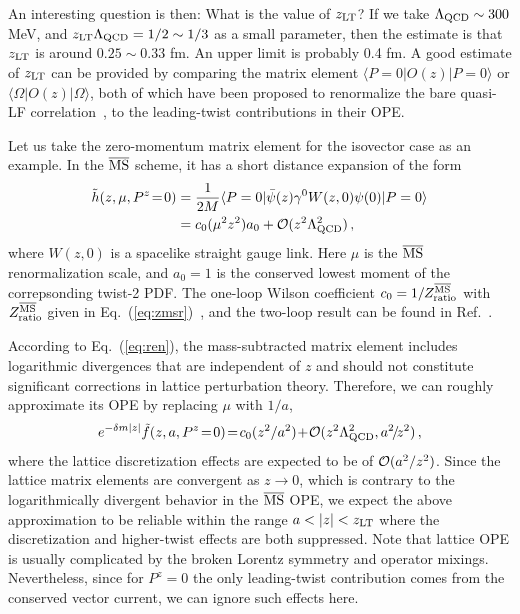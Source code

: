 \documentclass[preprint,12pt]{elsarticle}
\newcommand{\MS}{{\overline{\rm MS}}}
\newcommand{\nn}{\nonumber}
\DeclareRobustCommand{\eq}[1]{Eq.~(\ref{eq:#1})}
\begin{document}
An interesting question is then: What is the value of $z_{\rm LT}$?
If we take $\Lambda_{\rm QCD}\sim 300$ MeV, and  $z_{\rm LT}\Lambda_{\rm QCD}=1/2\sim 1/3$ as
a small parameter, then the estimate is that $z_{\rm LT}$ is around $0.25 \sim 0.33$ fm. An
upper limit is probably 0.4 fm. A good estimate of $z_{\rm LT}$ can be provided by comparing the matrix element $\langle P=0| O(z)|P=0\rangle$ or $\langle \Omega| O(z)|\Omega\rangle$, both of which have been proposed to renormalize the bare quasi-LF correlation~\cite{Radyushkin:2017cyf,Braun:2018brg,Li:2020xml}, to the leading-twist contributions in their OPE.
	
Let us take the zero-momentum matrix element  for the isovector case as an example. In the $\MS$ scheme, it has a short distance expansion of the form~\cite{Radyushkin:2017lvu,Izubuchi:2018srq}
\begin{align}
			\tilde{h}(z,\mu,P^z\!=\!0)&= {1\over 2M}\langle P=0| \bar{\psi}(z)\gamma^0 W(z,0)\psi(0)|P=0\rangle \nn\\
			& = c_0(\mu^2 z^2) a_0 + {\cal O}(z^2\Lambda_{\rm QCD}^2)\,,
\end{align}
where $W(z,0)$ is a spacelike straight gauge link. Here $\mu$ is the $\MS$ renormalization scale, and $a_0=1$ is the conserved lowest moment of the correpsonding twist-2 PDF. The one-loop Wilson coefficient $c_0=1/  Z^{\overline{\rm MS}}_{\rm ratio}$ with $Z^{\overline{\rm MS}}_{\rm ratio}$ given in \eq{zmsr}~\cite{Izubuchi:2018srq},
and the two-loop result can be found in Ref.~\cite{Li:2020xml}.

According to \eq{ren}, the mass-subtracted matrix element includes logarithmic divergences that are independent of $z$ and should not constitute significant corrections in lattice perturbation theory. Therefore, we can roughly approximate its OPE by replacing $\mu$ with $1/a$,
\begin{align}\label{eq:subtracted}
	e^{-\delta m |z|}\tilde{f}(z,a,P^z\!=\!0) \!=\! c_0(z^2/a^2) \!+\! {\cal O}(z^2\Lambda_{\rm QCD}^2, a^2\!/\!z^2)\,,
\end{align}
where the lattice discretization effects are expected to be of ${\cal O}(a^2/z^2)$.
Since the lattice matrix elements are convergent as $z\to0$, which is contrary to the logarithmically divergent behavior in the $\MS$ OPE, we expect the above approximation to be reliable within the range $a < |z| < z_{\rm LT}$ where the discretization and higher-twist effects are both suppressed. Note that lattice OPE is usually complicated by the broken Lorentz symmetry and operator mixings. Nevertheless, since for $P^z=0$ the only leading-twist contribution comes from the conserved vector current, we can ignore such effects here.
\end{document}
